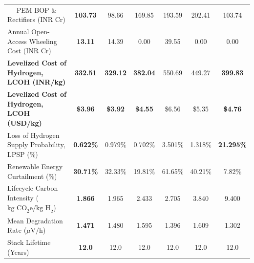 \documentclass[conference]{IEEEtran}
\begin{document}
\begin{table}[t]
\begin{center}
\begin{tabular}{lcccccc}
--- PEM BOP \& Rectifiers (INR Cr) & \textbf{103.73} & 98.66 & 169.85 & 193.59 & 202.41 & 103.74 \\
Annual Open-Access Wheeling Cost (INR Cr) & \textbf{13.11} & 14.39 & 0.00 & 39.55 & 0.00 & 0.00 \\
\midrule
\textbf{Levelized Cost of Hydrogen, LCOH (INR/kg)} & \textbf{332.51} & \textbf{329.12} & \textbf{382.04} & 550.69 & 449.27 & \textbf{399.83} \\
\textbf{Levelized Cost of Hydrogen, LCOH (USD/kg)} & \textbf{\$3.96} & \textbf{\$3.92} & \textbf{\$4.55} & \$6.56 & \$5.35 & \textbf{\$4.76} \\
Loss of Hydrogen Supply Probability, LPSP (\%) & \textbf{0.622\%} & 0.979\% & 0.702\% & 3.501\% & 1.318\% & \textbf{21.295\%} \\
Renewable Energy Curtailment (\%) & \textbf{30.71\%} & 32.33\% & 19.81\% & 61.65\% & 40.21\% & 7.82\% \\
Lifecycle Carbon Intensity ($\text{kg CO}_2\text{e/kg H}_2$) & \textbf{1.866} & 1.965 & 2.433 & 2.705 & 3.840 & 9.400 \\
Mean Degradation Rate ($\mu\text{V/h}$) & \textbf{1.471} & 1.480 & 1.595 & 1.396 & 1.609 & 1.302 \\
Stack Lifetime (Years) & \textbf{12.0} & 12.0 & 12.0 & 12.0 & 12.0 & 12.0 \\
\bottomrule
\end{tabular}
\label{tab:pareto_comp}
\end{center}
\end{table}
\end{document}
